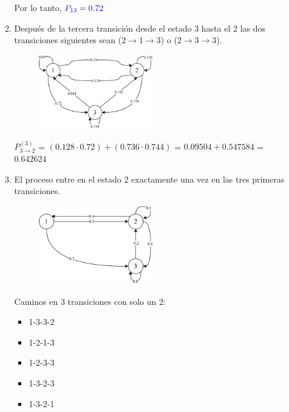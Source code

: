 \documentclass{templateNote}
\begin{document}
\begin{enumerate}[start = 3]
\begin{enumerate}[label=\alph*)]
        Por lo tanto, $\textcolor{blue}{P_{13}} = \textcolor{blue}{0.72}$

        \item Después de la tercera transición desde el estado 3 hasta el 2 las dos transiciones siguientes sean ($2\rightarrow1\rightarrow3$) o ($2\rightarrow3\rightarrow3$).
        
        \begin{figure}[H]
            \centering
            \includegraphics[width=0.5\textwidth]{img/ejer4_2.png}
        \end{figure}

        $P_{3\rightarrow2}^{(3)}$ = $(0.128\cdot0.72) + (0.736\cdot0.744)$ = $0.09504 + 0.547584$ = $0.642624$
        
        \item El proceso entre en el estado 2 exactamente una vez en las tres primeras transiciones.
        \begin{figure}[H]
            \centering
            \includegraphics[width=0.5\textwidth]{img/ejer42_2.png}
        \end{figure}

        \newpage
        Caminos en 3 transiciones con solo un 2:
        \begin{itemize}
            \item 1-3-3-2
            \item 1-2-1-3
            \item 1-2-3-3
            \item 1-3-2-3
            \item 1-3-2-1
        \end{itemize}


\end{enumerate}
\end{enumerate}
\end{document}
